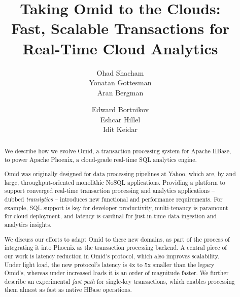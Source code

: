 \documentclass{vldb}
\begin{document}
\date{}

\title{Taking Omid to the Clouds: \\ 
Fast,  Scalable Transactions for Real-Time Cloud Analytics }

\author{
\alignauthor
Ohad Shacham\\
       \email{}
\alignauthor
Yonatan Gottesman\\ %
       \email{}
\alignauthor
Aran Bergman\\
       \email{}
\and
\alignauthor
Edward Bortnikov\\
       \email{}
\alignauthor
Eshcar Hillel\\
       \email{}
\alignauthor
Idit Keidar\\
       \email{}
} %


\maketitle


\begin{abstract}

We describe how we evolve Omid, a transaction processing system for Apache HBase, 
to power Apache Phoenix, a cloud-grade real-time SQL analytics engine.  

Omid was originally designed for data processing pipelines at Yahoo, which are, by and large, 
throughput-oriented monolithic NoSQL applications. 
Providing a platform 
to support 
converged real-time transaction processing and analytics applications --
dubbed {\em translytics} --  
introduces new functional and performance requirements. For example, SQL 
support is key for developer productivity, multi-tenancy is paramount for cloud deployment, 
and latency is cardinal for just-in-time data ingestion and analytics insights.

We discuss our efforts to adapt Omid to these new domains, 
as part of 
the process of integrating it into Phoenix as the transaction processing backend. A central piece
of our work is latency reduction in Omid's protocol, which also improves  scalability.  
Under light load, the new protocol's latency is 4x to 5x smaller than the legacy Omid's, whereas 
under increased loads it is an order of magnitude faster. We further describe an experimental 
\emph{fast path} for single-key transactions, which enables processing them almost as fast 
as native HBase operations.

\end{abstract}
\end{document}
